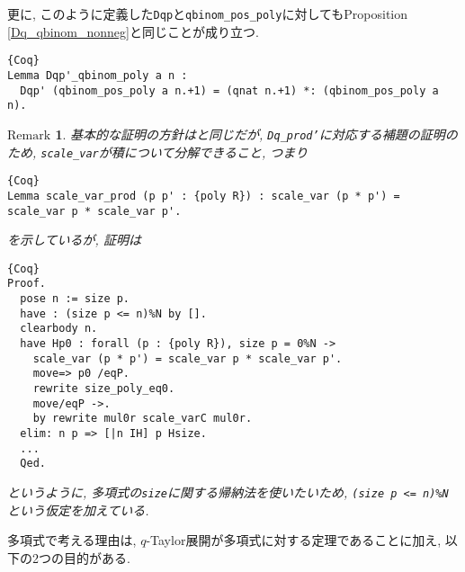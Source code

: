 \documentclass[11pt]{jarticle}
\theoremstyle{mystyle}
\newtheorem{rmk}[df]{$\textrm{Remark}$}
\newcommand{\brmk}{\begin{rmk}}
\newcommand{\ermk}{\end{rmk}}
\newcommand{\0}{\textbf{0}}
\newcommand{\1}{\textbf{1}}
\newcommand{\2}{\textbf{2}}
\begin{document}
更に, このように定義した{\tt Dqp}と{\tt qbinom\_pos\_poly}に対してもProposition \ref{Dq_qbinom_nonneg}と同じことが成り立つ. 
\begin{lstlisting}{Coq}
Lemma Dqp'_qbinom_poly a n :
  Dqp' (qbinom_pos_poly a n.+1) = (qnat n.+1) *: (qbinom_pos_poly a n).
\end{lstlisting}
\brmk
  基本的な証明の方針は\cite{Kac}と同じだが, {\tt Dq\_prod'}に対応する補題の証明のため, 
  {\tt scale\_var}が積について分解できること, つまり
  \begin{lstlisting}{Coq}
Lemma scale_var_prod (p p' : {poly R}) : scale_var (p * p') = scale_var p * scale_var p'. \end{lstlisting}
  を示しているが, 証明は
  \begin{lstlisting}{Coq}
Proof.
  pose n := size p.
  have : (size p <= n)%N by [].
  clearbody n.
  have Hp0 : forall (p : {poly R}), size p = 0%N ->
    scale_var (p * p') = scale_var p * scale_var p'.
    move=> p0 /eqP.
    rewrite size_poly_eq0.
    move/eqP ->.
    by rewrite mul0r scale_varC mul0r.
  elim: n p => [|n IH] p Hsize.
  ...
  Qed. \end{lstlisting}
  というように, 多項式の{\tt size}に関する帰納法を使いたいため, {\tt (size p <= n)\%N}
  という仮定を加えている. 
\ermk
多項式で考える理由は, $q$-Taylor展開が多項式に対する定理であることに加え, 以下の2つの目的がある. 
\end{document}
